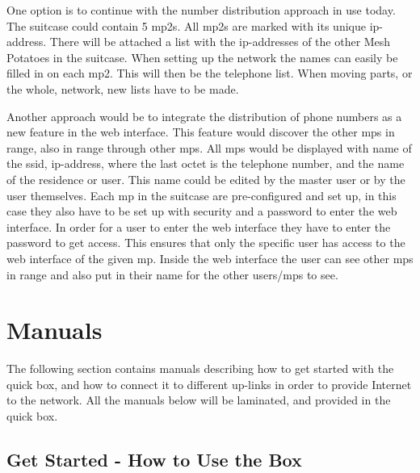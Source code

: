 One option is to continue with the number distribution approach in use today. The suitcase could contain 5 \glspl{mp2}. All \glspl{mp2} are marked with its unique \gls{ip}-address. There will be attached a list with the \gls{ip}-addresses of the other Mesh Potatoes in the suitcase. When setting up the network the names can easily be filled in on each \gls{mp2}. This will then be the telephone list. When moving parts, or the whole, network, new lists have to be made. 

Another approach would be to integrate the distribution of phone numbers as a new feature in the web interface. This feature would discover the other \glspl{mp} in range, also in range through other \glspl{mp}. All \glspl{mp} would be displayed with name of the \gls{ssid}, \gls{ip}-address, where the last octet is the telephone number, and the name of the residence or user. This name could be edited by the master user or by the user themselves. Each \gls{mp} in the suitcase are pre-configured and set up, in this case they also have to be set up with security and a password to enter the web interface. In order for a user to enter the web interface they have to enter the password to get access. This ensures that only the specific user has access to the web interface of the given \gls{mp}. Inside the web interface the user can see other \glspl{mp} in range and also put in their name for the other users/\glspl{mp} to see. 



\section{Manuals}
The following section contains manuals describing how to get started with the \gls{quick} box, and how to connect it to different up-links in order to provide Internet to the network. All the manuals below will be laminated, and provided in the \gls{quick} box. 
\clearpage
\subsection{Get Started - How to Use the Box}

\clearpage
